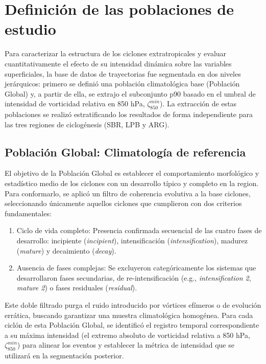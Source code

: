 
\section{Definición de las poblaciones de estudio}\label{sec:poblaciones_estudio}

Para caracterizar la estructura de los ciclones extratropicales y evaluar cuantitativamente el efecto de su intensidad dinámica sobre las variables superficiales, la base de datos de trayectorias fue segmentada en dos niveles jerárquicos: primero se definió una población climatológica base (Población Global) y, a partir de ella, se extrajo el subconjunto p90 basado en el umbral de intensidad de vorticidad relativa en 850 hPa, $\zeta_{850}^{min}$). 
La extracción de estas poblaciones se realizó estratificando los resultados de forma independiente para las tres regiones de ciclogénesis (SBR, LPB y ARG).

\subsection{Población Global: Climatología de referencia}\label{subsec:grupo_global}

El objetivo de la Población Global es establecer el comportamiento morfológico y estadístico medio de los ciclones con un desarrollo típico y completo en la region. 
Para conformarlo, se aplicó un filtro de coherencia evolutiva a la base ciclones, seleccionando únicamente aquellos ciclones que cumplieron con dos criterios fundamentales:

\begin{enumerate}
    \item Ciclo de vida completo: Presencia confirmada secuencial de las cuatro fases de desarrollo: incipiente (\textit{incipient}), intensificación (\textit{intensification}), madurez (\textit{mature}) y decaimiento (\textit{decay}).
    \item Ausencia de fases complejas: Se excluyeron categóricamente los sistemas que desarrollaron fases secundarias, de re-intensificación (e.g., \textit{intensification 2}, \textit{mature 2}) o fases residuales (\textit{residual}).
\end{enumerate}

Este doble filtrado purga el ruido introducido por vórtices efímeros o de evolución errática, buscando garantizar una muestra climatológica homogénea. 
Para cada ciclón de esta Población Global, se identificó el registro temporal correspondiente a su máxima intensidad (el extremo absoluto de vorticidad relativa a 850 hPa, $\zeta_{850}^{min}$) para alinear los eventos y establecer la métrica de intensidad que se utilizará en la segmentación posterior. 

